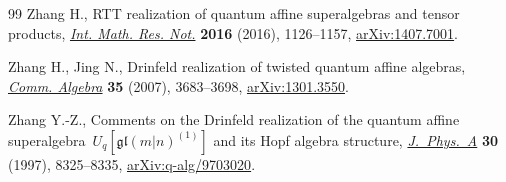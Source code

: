 \documentclass[pdftex]{sigma}
\numberwithin{equation}{section}
\begin{document}
\begin{thebibliography}{99}
Zhang H., R{TT} realization of quantum affine superalgebras and tensor
 products, \href{https://doi.org/10.1093/imrn/rnv167}{\textit{Int. Math. Res. Not.}} \textbf{2016} (2016), 1126--1157,
 \href{https://arxiv.org/abs/1407.7001}{arXiv:1407.7001}.

Zhang H., Jing N., Drinfeld realization of twisted quantum affine algebras,
 \href{https://doi.org/10.1080/00927870701404713}{\textit{Comm. Algebra}} \textbf{35} (2007), 3683--3698, \href{https://arxiv.org/abs/1301.3550}{arXiv:1301.3550}.

Zhang Y.-Z., Comments on the {D}rinfeld realization of the quantum affine
 superalgebra~{$U_q[\mathfrak{gl}(m|n)^{(1)}]$} and its {H}opf
 algebra structure, \href{https://doi.org/10.1088/0305-4470/30/23/028}{\textit{J.~Phys.~A}} \textbf{30} (1997), 8325--8335,
 \href{https://arxiv.org/abs/q-alg/9703020}{arXiv:q-alg/9703020}.

\end{thebibliography}\LastPageEnding
\end{document}
